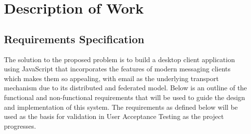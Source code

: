 \chapter{Description of Work}

\section{Requirements Specification}
The solution to the proposed problem is to build a desktop client application using JavaScript that incorporates the features of modern messaging clients which makes them so appealing, with email as the underlying transport mechanism due to its distributed and federated model. Below is an outline of the functional and non-functional requirements that will be used to guide the design and implementation of this system. The requirements as defined below will be used as the basis for validation in User Acceptance Testing as the project progresses.

